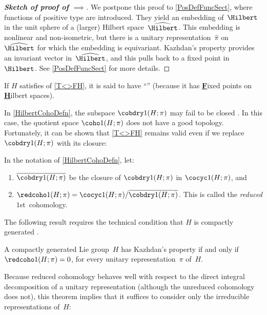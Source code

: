 \begin{proof}[\bf {} Sketch of proof of $\implies$]
We postpone this proof to \cref{PosDefFuncSect}, where functions of positive type are introduced. They yield an embedding of~$\Hilbert$ in the unit sphere of a (larger) Hilbert space~$\widehat\Hilbert$. This embedding is nonlinear and non-isometric, but there is a unitary representation~$\widehat\pi$ on~$\widehat\Hilbert$ for which the embedding is equivariant. Kazhdan's property provides an invariant vector in~$\widehat\Hilbert$, and this pulls back to a fixed point in~$\Hilbert$.
See \cref{PosDefFuncSect} for more details.
\end{proof}

\begin{rem}
If $H$ satisfies  of \cref{T<>FH}, it is said to have ``'' (because it has \underline{\textbf{F}}ixed points on \underline{\textbf{H}}ilbert spaces).
\end{rem}

In \cref{HilbertCohoDefn}, the subspace $\cobdry1(H; \pi)$ may fail to be closed . In this case, the quotient space $\coho1(H; \pi)$ does not have a good topology. Fortunately, it can be shown that \cref{T<>FH} remains valid even if we replace $\cobdry1(H;\pi)$ with its closure:

\begin{defn}
In the notation of \cref{HilbertCohoDefn}, let:
	\begin{enumerate}
	\item $\overline{\cobdry1(H; \pi)}$ be the closure of $\cobdry1(H; \pi)$ in $\cocyc1(H;\pi)$,
	and
	\item $\redcoho1(H; \pi) = \cocyc1(H; \pi) / \overline{\cobdry1(H; \pi)}$. This is called the \emph{reduced} $1$st~cohomology.
	\end{enumerate}
\end{defn}

The following result requires the technical condition that $H$ is compactly generated .

\begin{thm} \label{T<>H1bar=0}
A compactly generated Lie group~$H$ has Kazhdan's property if and only if\/
 $\redcoho1(H; \pi) = 0$, for every unitary
representation~$\pi$ of~$H$.
\end{thm}

Because reduced cohomology behaves well with respect to the direct integral decomposition of a unitary representation
(although the unreduced cohomology does not), this theorem implies that it suffices to consider only the irreducible representations of~$H$:


